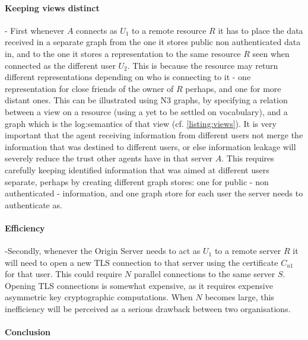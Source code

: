 \documentclass[a4paper]{llncs}
\begin{document}
\paragraph{Keeping views distinct}-
First whenever $A$ connects as $U_1$ to a remote resource $R$ it has to place the data received in a separate graph from the one it stores public non authenticated data in, and to the one it stores a representation to the same resource $R$ seen when connected as the different user $U_2$. 
This is because the resource may return different representations depending on who is connecting to it - one representation for close friends of the owner of $R$ perhaps, and one for more distant ones. 
This can be illustrated using N3 graphs, by specifying a relation between a view on a resource (using a yet to be settled on vocabulary), and a graph which is the log:semantics of that view (cf. \autoref{listing:views}). 
It is very important that the agent receiving information from different users not merge the information that was destined to different users, or else information leakage will severely reduce the trust other agents have in that server $A$. 
This requires carefully keeping identified information that was aimed at different users separate, perhaps by creating different graph stores: one for public - non authenticated - information, and one graph store for each user the server needs to authenticate as.



\paragraph{Efficiency}-Secondly, whenever the Origin Server needs to act as $U_1$ to a remote server $R$ it will need to open a new TLS connection to that server using the certificate $C_{u1}$ for that user.
This could require $N$ parallel connections to the same server $S$. 
Opening TLS connections is somewhat expensive, as it requires expensive asymmetric key cryptographic computations. 
When $N$ becomes large, this inefficiency will be perceived as a serious drawback between two organisations.
 
\paragraph{Conclusion}
\end{document}

